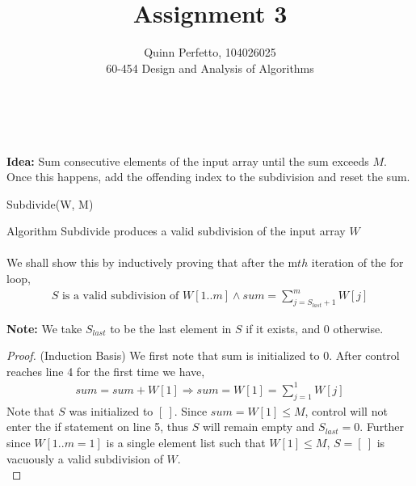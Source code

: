 \documentclass[12pt]{article}
\newenvironment{lemma}[2][Lemma]{\begin{trivlist}
\item[\hskip \labelsep {\bfseries #1}\hskip \labelsep {\bfseries #2.}]}{\end{trivlist}}
\newenvironment{question}[2][Question]{\begin{trivlist}
\item[\hskip \labelsep {\bfseries #1}\hskip \labelsep {\bfseries #2.}]}{\end{trivlist}}
\begin{document}
\title{Assignment 3}%
\author{Quinn Perfetto, 104026025\\ %
 60-454 Design and Analysis of Algorithms} %

\maketitle

\begin{question}{1 (a)}
  \leavevmode \\ \\
  \textbf{Idea:} Sum consecutive elements of the input array until the sum
  exceeds $M$.  Once this happens, add the offending index to the subdivision
  and reset the sum. \\
  \begin{algorithm}[H]
    \caption{Subdivide(W, M)}
    \BlankLine

  \end{algorithm}

  \begin{lemma}{1.1} Algorithm Subdivide produces a valid subdivision of the input array $W$
    \leavevmode \\ \\
    We shall show this by inductively proving that after the m$th$ iteration
    of the for loop,
    \begin{align*}
      S \text{ is a valid subdivision of } W[1..m] \land sum = \sum_{j=S_{last} + 1}^{m} W[j]
    \end{align*}

    \textbf{Note:} We take $S_{last}$ to be the last element in $S$ if it exists,
    and 0 otherwise. \\

    \begin{proof}
      (Induction Basis) We first note that sum is initialized to 0.  After
      control reaches line 4 for the first time we have,
      \begin{align*}
        sum = sum + W[1] \Rightarrow sum = W[1] = \sum_{j=1}^{1} W[j]
      \end{align*}
      Note that $S$ was initialized to $[\ ]$.  Since $sum = W[1] \leq M$, control
      will not enter the if statement on line 5, thus $S$ will remain empty and
      $S_{last} = 0$.  Further since $W[1..m=1]$ is a single element list such that
      $W[1] \leq M$, $S = [\ ]$ is vacuously a valid subdivision of $W$. \\


\end{proof}
\end{lemma}
\end{question}
\end{document}
